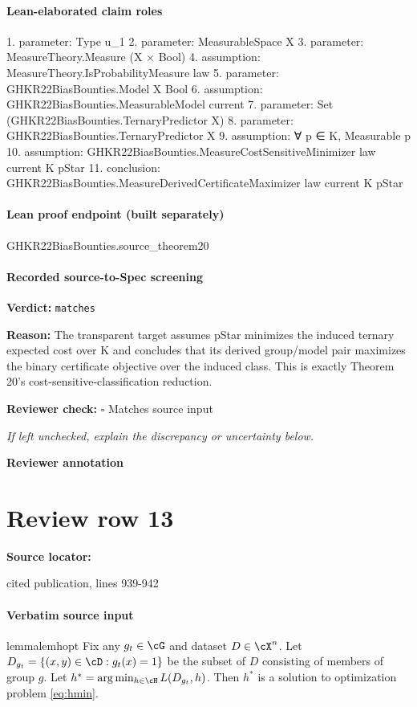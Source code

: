 \documentclass[10pt]{article}
\newcommand{\reviewerbox}{%
  \par\noindent\fbox{\parbox{0.96\linewidth}{\rule{0pt}{0.38in}}}\par
}
\newcommand{\reviewmatch}[1]{%
  \par\noindent\textbf{Reviewer check:} $\square$\; #1\par
  \noindent\emph{If left unchecked, explain the discrepancy or uncertainty below.}\par
}
\begin{document}
\paragraph{Lean-elaborated claim roles}\begin{ReviewVerbatim}
1. parameter: Type u_1
2. parameter: MeasurableSpace X
3. parameter: MeasureTheory.Measure (X × Bool)
4. assumption: MeasureTheory.IsProbabilityMeasure law
5. parameter: GHKR22BiasBounties.Model X Bool
6. assumption: GHKR22BiasBounties.MeasurableModel current
7. parameter: Set (GHKR22BiasBounties.TernaryPredictor X)
8. parameter: GHKR22BiasBounties.TernaryPredictor X
9. assumption: ∀ p ∈ K, Measurable p
10. assumption: GHKR22BiasBounties.MeasureCostSensitiveMinimizer law current K pStar
11. conclusion: GHKR22BiasBounties.MeasureDerivedCertificateMaximizer law current K pStar
\end{ReviewVerbatim}

\paragraph{Lean proof endpoint (built separately)}\begin{ReviewVerbatim}
GHKR22BiasBounties.source_theorem20
\end{ReviewVerbatim}

\paragraph{Recorded source-to-Spec screening}
\textbf{Verdict:} \texttt{matches}
\\
{\raggedright
\textbf{Reason:} The transparent target assumes pStar minimizes the induced ternary expected cost over K and concludes that its derived group/\allowbreak{}model pair maximizes the binary certificate objective over the induced class.\allowbreak{} This is exactly Theorem 20's cost-\allowbreak{}sensitive-\allowbreak{}classification reduction.\allowbreak{}
\par}
\reviewmatch{Matches source input}
\noindent\textbf{Reviewer annotation}\par
\reviewerbox
\clearpage
\hypertarget{source-claim-a168dec775709541}{}
\section*{Review row 13}
\textbf{Source locator:} {\footnotesize\raggedright cited publication, lines 939-\allowbreak{}942\par}
\paragraph{Verbatim source input}
\begin{ReviewVerbatim}
\begin{restatable}{lemma}{lemhopt}
\label{lem:hopt}
 Fix any $g_t \in \cG$ and dataset $D \in \cX^n$. Let $D_{g_t} = \{(x,y) \in \cD : g_t(x) = 1\}$ be the subset of $D$ consisting of members of group $g$. Let $h^* = \arg\min_{h \in \cH} L(D_{g_t},h)$. Then $h^*$ is a solution to optimization problem \ref{eq:hmin}.
\end{restatable}
\end{ReviewVerbatim}
\end{document}
